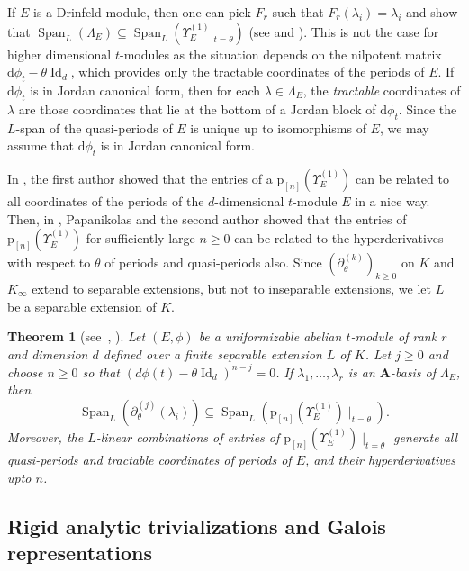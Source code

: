 \documentclass[10pt,a4paper]{amsart}
\theoremstyle{plain} %
\newtheorem{Theorem}{Theorem}[section]
\theoremstyle{definition}
\theoremstyle{remark}
\newcommand{\bA}{\mathbf{A}}
\newcommand{\rd}{\mathrm{d}}
\newcommand{\Id}{\operatorname{Id}}
\newcommand{\Span}{\operatorname{Span}}
\newcommand{\hde}[1]{\partial^{(#1)}}  %
\newcommand{\prol}[1]{\mathrm{p}_{[#1]}}
\numberwithin{equation}{subsection}
\begin{document}
  
 If $E$ is a Drinfeld module, then one can pick $F_r$ such that $F_r(\lambda_i)=\lambda_i$ and show that $\Span_{L}(\Lambda_E) \subseteq \Span_L(\Upsilon_E^{(1)}|_{t=\theta})$ (see \cite[\S4.2]{fp:aiacnn} and \cite[Prop.~3.4.7(c)]{cc-mp:aipldm}). This is not the case for higher dimensional $t$-modules as the situation depends on the nilpotent matrix $\rd\phi_t-\theta\Id_d$, which provides only the tractable coordinates of the periods of $E$.  If $\rd\phi_t$ is in Jordan canonical form, then for each $\lambda\in \Lambda_E$, the \emph{tractable} coordinates of $\lambda$ are those coordinates that lie at the bottom of a Jordan block of $\rd\phi_t$. 
Since the $L$-span of the quasi-periods of $E$ is unique up to isomorphisms of $E$, we may assume that $\rd\phi_t$ is in Jordan canonical form.

 
 In \cite{am:ptmsv}, the first author showed that the entries of a $\prol{n}(\Upsilon_E^{(1)})$ can be related to all coordinates of the periods of the $d$-dimensional $t$-module $E$ in a nice way. Then,  in \cite{cn-mp:hpqpam}, Papanikolas and the second author showed that the entries of $\prol{n}(\Upsilon_E^{(1)})$ for sufficiently large $n \geq 0$ can be related to the hyperderivatives with respect to $\theta$ of periods and quasi-periods also. Since $(\hde{k}_\theta)_{k\geq 0}$ on $K$ and $K_{\infty}$ extend to separable extensions, but not to inseparable extensions, we let $L$ be a separable extension of $K$. 



\begin{Theorem}[see~{\cite[Main Theorem]{am:ptmsv}, \cite[Theorem F]{cn-mp:hpqpam}}]\label{T:hyperRATnPer}
 Let $(E,\phi)$ be a uniformizable abelian  $t$-module of rank $r$ and dimension $d$ defined over a finite separable extension $L$ of $K$.  
 Let $j \geq 0$ and choose $n\geq 0$ so that $(d\phi(t)-\theta \Id_d)^{n-j}=0$.
 If $\lambda_1, \dots, \lambda_r$ is an $\bA$-basis of $\Lambda_E$, then
 \[
 \Span_{L}\left(\hde{j}_\theta(\lambda_i)\right) \subseteq  \Span_{L}\left(\prol{n}(\Upsilon_E^{(1)}) \mid_{t=\theta} \right). 
 \]
 Moreover, the $L$-linear combinations of entries of $\prol{n}(\Upsilon_E^{(1)}) \mid_{t=\theta}$ generate all quasi-periods and tractable coordinates of periods of $E$, and their hyperderivatives upto $n$. 
\end{Theorem}



\subsection{Rigid analytic trivializations and Galois representations}\label{Sub:RATsAndGaloisReps}
\end{document}
